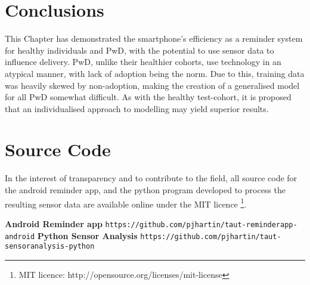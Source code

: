 \section{Conclusions}
This Chapter has demonstrated the smartphone's efficiency as a reminder system for healthy individuals and PwD, with the potential to use sensor data to influence delivery. PwD, unlike their healthier cohorts, use technology in an atypical manner, with lack of adoption being the norm. Due to this, training data was heavily skewed by non-adoption, making the creation of a generalised model for all PwD somewhat difficult. As with the healthy test-cohort, it is proposed that an individualised approach to modelling may yield superior results.

\section{Source Code}
In the interest of transparency and to contribute to the field, all source code for the android reminder app, and the python program developed to process the resulting sensor data are available online under the MIT licence \footnote{MIT licence: http://opensource.org/licenses/mit-license}.

\textbf{Android Reminder app} \newline \texttt{https://github.com/pjhartin/taut-reminderapp-android}
\newline \textbf{Python Sensor Analysis} \newline \texttt{https://github.com/pjhartin/taut-sensoranalysis-python}  
